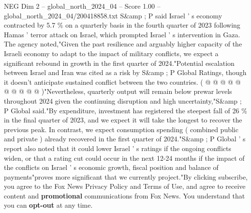 \begin{textsample}{NEG Dim 2 – global\_north\_2024\_04 – Score 1.00 – global\_north\_2024\_04/200418858.txt}
S\&amp ; P said Israel ' s economy contracted by 5.7 \% on a quarterly basis in the fourth quarter of 2023 following Hamas ' terror attack on Israel, which prompted Israel ' s intervention in Gaza.
The agency noted,"Given the past resilience and arguably higher capacity of the Israeli economy to adapt to the impact of military conflicts, we expect a significant rebound in growth in the first quarter of 2024."Potential escalation between Israel and Iran was cited as a risk by S\&amp ; P Global Ratings, though it doesn't anticipate sustained conflict between the two countries. ( @ @ @ @ @ @ @ @ @ @ )"Nevertheless, quarterly output will remain below prewar levels throughout 2024 given the continuing disruption and high uncertainty,"S\&amp ; P Global said."By expenditure, investment has registered the steepest fall of 26 \% in the final quarter of 2023, and we expect it will take the longest to recover the previous peak.
In contrast, we expect consumption spending ( combined public and private ) already recovered in the first quarter of 2024."S\&amp ; P Global ' s report also noted that it could lower Israel ' s ratings if the ongoing conflicts widen, or that a rating cut could occur in the next 12-24 months if the impact of the conflicts on Israel ' s economic growth, fiscal position and balance of payments"proves more significant that we currently project."By clicking subscribe, you agree to the Fox News Privacy Policy and Terms of Use, and agree to receive content and \textbf{promotional} communications from Fox News.
You understand that you can \textbf{opt-out} at any time.

\end{textsample}
